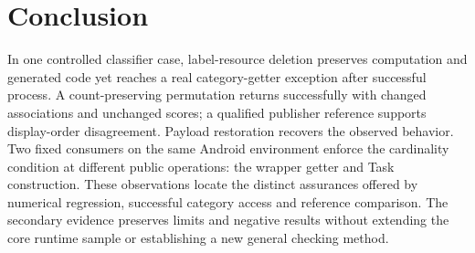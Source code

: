 \documentclass[10pt,conference]{IEEEtran}
\begin{document}
\section{Conclusion}
In one controlled classifier case, label-resource deletion preserves computation and generated code yet reaches a real category-getter exception after successful process. A count-preserving permutation returns successfully with changed associations and unchanged scores; a qualified publisher reference supports display-order disagreement. Payload restoration recovers the observed behavior. Two fixed consumers on the same Android environment enforce the cardinality condition at different public operations: the wrapper getter and Task construction. These observations locate the distinct assurances offered by numerical regression, successful category access and reference comparison. The secondary evidence preserves limits and negative results without extending the core runtime sample or establishing a new general checking method.
\end{document}
